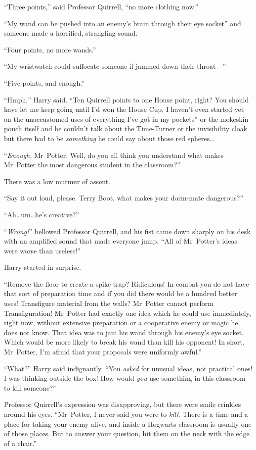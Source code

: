 “Three points,” said Professor Quirrell, “no more clothing now.”

“My wand can be pushed into an enemy’s brain through their eye socket” and someone made a horrified, strangling sound.

“Four points, no more wands.”

“My wristwatch could suffocate someone if jammed down their throat—”

“Five points, and enough.”

“Hmph,” Harry said. “Ten Quirrell points to one House point, right? You should have let me keep going until I’d won the House Cup, I haven’t even started yet on the unaccustomed uses of everything I’ve got in my pockets” or the mokeskin pouch itself and he couldn’t talk about the Time-Turner or the invisibility cloak but there had to be \emph{something} he could say about those red spheres…

“\emph{Enough,} Mr~Potter. Well, do you all think you understand what makes Mr~Potter the most dangerous student in the classroom?”

There was a low murmur of assent.

“Say it out loud, please. Terry Boot, what makes your dorm-mate dangerous?”

“Ah…um…he’s creative?”

“\emph{Wrong!}” bellowed Professor Quirrell, and his fist came down sharply on his desk with an amplified sound that made everyone jump. “All of Mr~Potter’s ideas were worse than useless!”

Harry started in surprise.

“Remove the floor to create a spike trap? Ridiculous! In combat you do not have that sort of preparation time and if you did there would be a hundred better uses! Transfigure material from the walls? Mr~Potter cannot perform Transfiguration! Mr~Potter had exactly one idea which he could use immediately, right now, without extensive preparation or a cooperative enemy or magic he does not know. That idea was to jam his wand through his enemy’s eye socket. Which would be more likely to break his wand than kill his opponent! In short, Mr~Potter, I’m afraid that your proposals were uniformly awful.”

“What?” Harry said indignantly. “You \emph{asked} for unusual ideas, not practical ones! I was thinking outside the box! How would \emph{you} use something in this classroom to kill someone?”

Professor Quirrell’s expression was disapproving, but there were smile crinkles around his eyes. “Mr~Potter, I never said you were to \emph{kill}. There is a time and a place for taking your enemy alive, and inside a Hogwarts classroom is usually one of those places. But to answer your question, hit them on the neck with the edge of a chair.”

